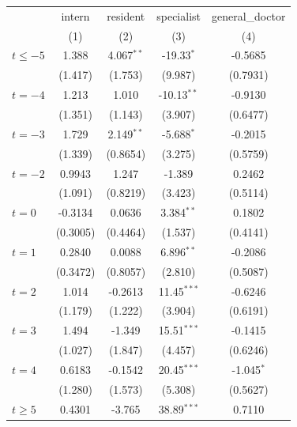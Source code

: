 \begingroup
\centering
\begin{tabular}{lcccc}
   \toprule
                          & intern   & resident     & specialist    & general\_doctor \\    
                          & (1)      & (2)          & (3)           & (4)\\  
   \midrule 
   $t \leq -5$            & 1.388    & 4.067$^{**}$ & -19.33$^{*}$  & -0.5685\\   
                          & (1.417)  & (1.753)      & (9.987)       & (0.7931)\\   
   $t = -4$               & 1.213    & 1.010        & -10.13$^{**}$ & -0.9130\\   
                          & (1.351)  & (1.143)      & (3.907)       & (0.6477)\\   
   $t = -3$               & 1.729    & 2.149$^{**}$ & -5.688$^{*}$  & -0.2015\\   
                          & (1.339)  & (0.8654)     & (3.275)       & (0.5759)\\   
   $t = -2$               & 0.9943   & 1.247        & -1.389        & 0.2462\\   
                          & (1.091)  & (0.8219)     & (3.423)       & (0.5114)\\   
   $t = 0$                & -0.3134  & 0.0636       & 3.384$^{**}$  & 0.1802\\   
                          & (0.3005) & (0.4464)     & (1.537)       & (0.4141)\\   
   $t = 1$                & 0.2840   & 0.0088       & 6.896$^{**}$  & -0.2086\\   
                          & (0.3472) & (0.8057)     & (2.810)       & (0.5087)\\   
   $t = 2$                & 1.014    & -0.2613      & 11.45$^{***}$ & -0.6246\\   
                          & (1.179)  & (1.222)      & (3.904)       & (0.6191)\\   
   $t = 3$                & 1.494    & -1.349       & 15.51$^{***}$ & -0.1415\\   
                          & (1.027)  & (1.847)      & (4.457)       & (0.6246)\\   
   $t = 4$                & 0.6183   & -0.1542      & 20.45$^{***}$ & -1.045$^{*}$\\   
                          & (1.280)  & (1.573)      & (5.308)       & (0.5627)\\   
   $t \geq 5$             & 0.4301   & -3.765       & 38.89$^{***}$ & 0.7110\\   

\end{tabular}
